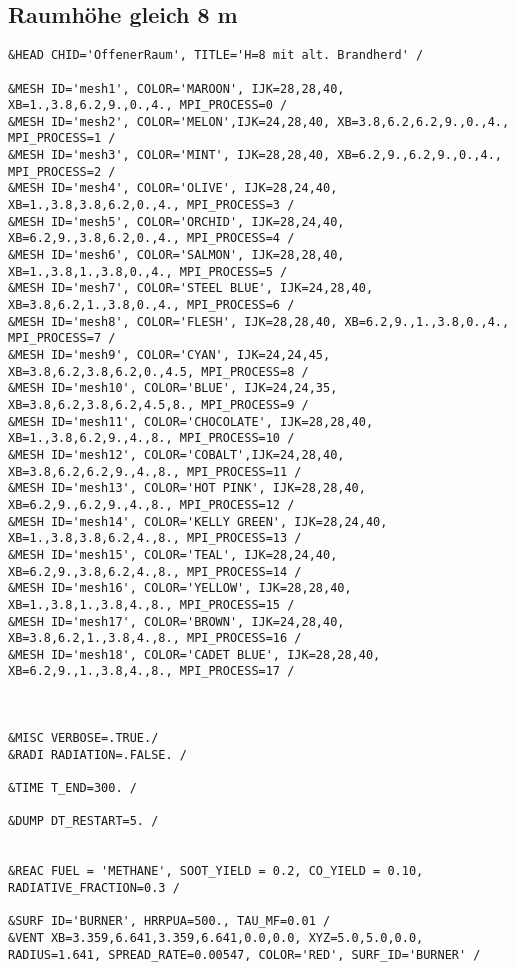 \subsection*{Raumhöhe gleich 8 m}
\begin{lstlisting}[emptylines=0,basicstyle=\tiny]
&HEAD CHID='OffenerRaum', TITLE='H=8 mit alt. Brandherd' /

&MESH ID='mesh1', COLOR='MAROON', IJK=28,28,40, XB=1.,3.8,6.2,9.,0.,4., MPI_PROCESS=0 /
&MESH ID='mesh2', COLOR='MELON',IJK=24,28,40, XB=3.8,6.2,6.2,9.,0.,4., MPI_PROCESS=1 /
&MESH ID='mesh3', COLOR='MINT', IJK=28,28,40, XB=6.2,9.,6.2,9.,0.,4., MPI_PROCESS=2 /
&MESH ID='mesh4', COLOR='OLIVE', IJK=28,24,40, XB=1.,3.8,3.8,6.2,0.,4., MPI_PROCESS=3 /
&MESH ID='mesh5', COLOR='ORCHID', IJK=28,24,40, XB=6.2,9.,3.8,6.2,0.,4., MPI_PROCESS=4 /
&MESH ID='mesh6', COLOR='SALMON', IJK=28,28,40, XB=1.,3.8,1.,3.8,0.,4., MPI_PROCESS=5 /
&MESH ID='mesh7', COLOR='STEEL BLUE', IJK=24,28,40, XB=3.8,6.2,1.,3.8,0.,4., MPI_PROCESS=6 /
&MESH ID='mesh8', COLOR='FLESH', IJK=28,28,40, XB=6.2,9.,1.,3.8,0.,4., MPI_PROCESS=7 /
&MESH ID='mesh9', COLOR='CYAN', IJK=24,24,45, XB=3.8,6.2,3.8,6.2,0.,4.5, MPI_PROCESS=8 /
&MESH ID='mesh10', COLOR='BLUE', IJK=24,24,35, XB=3.8,6.2,3.8,6.2,4.5,8., MPI_PROCESS=9 /
&MESH ID='mesh11', COLOR='CHOCOLATE', IJK=28,28,40, XB=1.,3.8,6.2,9.,4.,8., MPI_PROCESS=10 /
&MESH ID='mesh12', COLOR='COBALT',IJK=24,28,40, XB=3.8,6.2,6.2,9.,4.,8., MPI_PROCESS=11 /
&MESH ID='mesh13', COLOR='HOT PINK', IJK=28,28,40, XB=6.2,9.,6.2,9.,4.,8., MPI_PROCESS=12 /
&MESH ID='mesh14', COLOR='KELLY GREEN', IJK=28,24,40, XB=1.,3.8,3.8,6.2,4.,8., MPI_PROCESS=13 /
&MESH ID='mesh15', COLOR='TEAL', IJK=28,24,40, XB=6.2,9.,3.8,6.2,4.,8., MPI_PROCESS=14 /
&MESH ID='mesh16', COLOR='YELLOW', IJK=28,28,40, XB=1.,3.8,1.,3.8,4.,8., MPI_PROCESS=15 /
&MESH ID='mesh17', COLOR='BROWN', IJK=24,28,40, XB=3.8,6.2,1.,3.8,4.,8., MPI_PROCESS=16 /
&MESH ID='mesh18', COLOR='CADET BLUE', IJK=28,28,40, XB=6.2,9.,1.,3.8,4.,8., MPI_PROCESS=17 /



&MISC VERBOSE=.TRUE./
&RADI RADIATION=.FALSE. /

&TIME T_END=300. /

&DUMP DT_RESTART=5. /


&REAC FUEL = 'METHANE', SOOT_YIELD = 0.2, CO_YIELD = 0.10, RADIATIVE_FRACTION=0.3 /

&SURF ID='BURNER', HRRPUA=500., TAU_MF=0.01 /
&VENT XB=3.359,6.641,3.359,6.641,0.0,0.0, XYZ=5.0,5.0,0.0, RADIUS=1.641, SPREAD_RATE=0.00547, COLOR='RED', SURF_ID='BURNER' /




\end{lstlisting}
